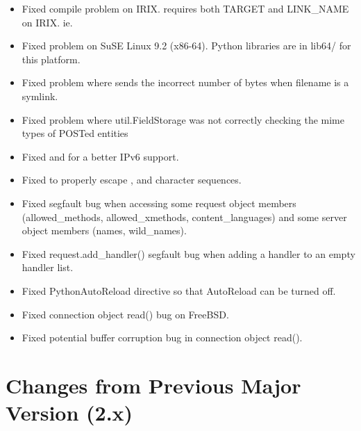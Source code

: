 \begin{itemize}
    \item 
      Fixed compile problem on IRIX.  requires both TARGET and LINK_NAME
      on IRIX. ie. 
    \item
      Fixed  problem on SuSE Linux 9.2 (x86-64). Python libraries
      are in lib64/ for this platform.
    \item
      Fixed  problem where  sends the incorrect
      number of bytes when filename is a symlink. 
    \item
      Fixed problem where util.FieldStorage was not correctly checking the mime
      types of POSTed entities
    \item
      Fixed  and  for a better IPv6 support. 
    \item
      Fixed  to properly escape , 
      and  character sequences. 
    \item
      Fixed segfault bug when accessing some request object members 
      (allowed_methods, allowed_xmethods, content_languages) and some server
      object members (names, wild_names).
    \item
      Fixed request.add_handler() segfault bug when adding a handler to an empty
      handler list.
    \item
      Fixed PythonAutoReload directive so that AutoReload can be turned off.
    \item
      Fixed connection object read() bug on FreeBSD.
    \item
      Fixed potential buffer corruption bug in connection object read().
\end{itemize}

\chapter{Changes from Previous Major Version (2.x)\label{app-changes-from-2.x}}


